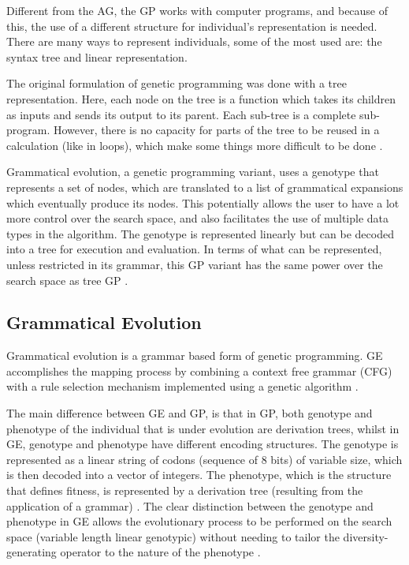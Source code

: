 \documentclass[journal]{IEEEtran}
\begin{document}
	Different from the AG, the GP works with computer programs, and because of this, the use of a different structure for individual's representation is needed. There are many ways to represent individuals, some of the most used are: the syntax tree and linear representation.
	
	The original formulation of genetic programming was done with a tree representation. Here, each node on the tree is a function which takes its children as inputs and sends its output to its parent. Each sub-tree is a complete sub-program. However, there is no capacity for parts of the tree to be reused in a calculation (like in loops), which make some things more difficult to be done \cite{harris2015comparison}. 
	
	Grammatical evolution, a genetic programming variant, uses a genotype that represents a set of nodes, which are translated to a list of grammatical expansions which eventually produce its nodes. This potentially allows the user to have a lot more control over the search space, and also facilitates the use of multiple data types in the algorithm. The genotype is represented linearly but can be decoded into a tree for execution and evaluation. In terms of what can be represented, unless restricted in its grammar, this GP variant has the same power over the search space as tree GP \cite{harris2015comparison}.
	
	
	\subsection{Grammatical Evolution} \label{subsection:grammaticalEvolution}
	
	Grammatical evolution is a grammar based form of genetic programming. GE accomplishes the mapping process by combining a context free grammar (CFG) with a rule selection mechanism implemented using a genetic algorithm \cite{byrne2015optimising}.
	
	The main difference between GE and GP, is that in GP, both genotype and phenotype of the individual that is under evolution are derivation trees, whilst in GE, genotype and phenotype have different encoding structures. The genotype is represented as a linear string of codons (sequence of 8 bits) of variable size, which is then decoded into a vector of integers. The phenotype, which is the structure that defines fitness, is represented by a derivation tree (resulting from the application of a grammar) \cite{cerri2013grammatical}. The clear distinction between the genotype and phenotype in GE allows the evolutionary process to be performed on the search space (variable length linear genotypic) without needing to tailor the diversity-generating operator to the nature of the phenotype \cite{sabar2013grammatical}.
	
\end{document}
